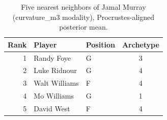 \begin{table}[htbp]
  \centering\small
  \begin{tabular}{rllc}
    \toprule
    Rank & Player & Position & Archetype \\
    \midrule
    1 & Randy Foye & G & 3 \\
    2 & Luke Ridnour & G & 4 \\
    3 & Walt Williams & F & 4 \\
    4 & Mo Williams & G & 1 \\
    5 & David West & F & 4 \\
    \bottomrule
  \end{tabular}
  \caption{Five nearest neighbors of Jamal Murray (curvature_m3 modality), Procrustes-aligned posterior mean.}
  \label{tab:Jamal_Murray_neighbors_curvature_m3}
\end{table}

